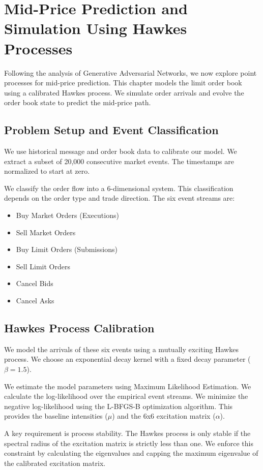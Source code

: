 \chapter{Mid-Price Prediction and Simulation Using Hawkes Processes}

Following the analysis of Generative Adversarial Networks, we now explore point processes for mid-price prediction. This chapter models the limit order book using a calibrated Hawkes process. We simulate order arrivals and evolve the order book state to predict the mid-price path.

\section{Problem Setup and Event Classification}

We use historical message and order book data to calibrate our model. We extract a subset of 20,000 consecutive market events. The timestamps are normalized to start at zero.

We classify the order flow into a 6-dimensional system. This classification depends on the order type and trade direction. The six event streams are:
\begin{itemize}
    \item Buy Market Orders (Executions)
    \item Sell Market Orders
    \item Buy Limit Orders (Submissions)
    \item Sell Limit Orders
    \item Cancel Bids
    \item Cancel Asks
\end{itemize}

\section{Hawkes Process Calibration}

We model the arrivals of these six events using a mutually exciting Hawkes process. We choose an exponential decay kernel with a fixed decay parameter ($\beta = 1.5$).

We estimate the model parameters using Maximum Likelihood Estimation. We calculate the log-likelihood over the empirical event streams. We minimize the negative log-likelihood using the L-BFGS-B optimization algorithm. This provides the baseline intensities ($\mu$) and the 6x6 excitation matrix ($\alpha$).

A key requirement is process stability. The Hawkes process is only stable if the spectral radius of the excitation matrix is strictly less than one. We enforce this constraint by calculating the eigenvalues and capping the maximum eigenvalue of the calibrated excitation matrix.

